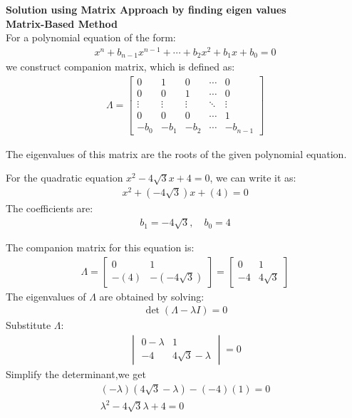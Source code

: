 \documentclass[journal]{IEEEtran}
\begin{document}
\textbf{ Solution using Matrix Approach by finding eigen values}\\
\textbf{Matrix-Based Method}\\
For a polynomial equation of the form:
\begin{align}
    x^n + b_{n-1}x^{n-1} + \cdots + b_2x^2 + b_1x + b_0 = 0
\end{align}
we construct companion matrix, which is defined as:
\begin{align}
    \Lambda =
    \begin{bmatrix}
        0 & 1 & 0 & \cdots & 0 \\
        0 & 0 & 1 & \cdots & 0 \\
        \vdots & \vdots & \vdots & \ddots & \vdots \\
        0 & 0 & 0 & \cdots & 1 \\
        -b_0 & -b_1 & -b_2 & \cdots & -b_{n-1}
    \end{bmatrix}
\end{align}

The eigenvalues of this matrix are the roots of the given polynomial equation.

For the quadratic equation \( x^2 - 4{\sqrt{3}}x + 4 = 0 \), we can write it as:
\begin{align}
    x^2 + (-4{\sqrt{3}})x + (4) = 0
\end{align}
The coefficients are:
\begin{align*}
    b_1 = -4{\sqrt{3}}, \quad b_0 = 4
\end{align*}

The companion matrix for this equation is:
\begin{align}
    \Lambda =
    \begin{bmatrix}
        0 & 1 \\
        -(4) & -(-4{\sqrt{3}})
    \end{bmatrix}
    =
    \begin{bmatrix}
        0 & 1 \\
        -4 & 4{\sqrt{3}} 
    \end{bmatrix}
\end{align}
The eigenvalues of \( \Lambda \) are obtained by solving:
\begin{align}
    \det(\Lambda - \lambda I) = 0
\end{align}
Substitute \( \Lambda \):
\begin{align}
    \begin{vmatrix}
        0 - \lambda & 1 \\
        -4 & 4{\sqrt{3}} - \lambda
    \end{vmatrix}
    = 0
\end{align}
Simplify the determinant,we get
\begin{align}
    (-\lambda)(4{\sqrt{3}} - \lambda) - (-4)(1) = 0 \\
    \lambda^2 - {4}{\sqrt{3}}\lambda +4 = 0
\end{align}
\end{document}
